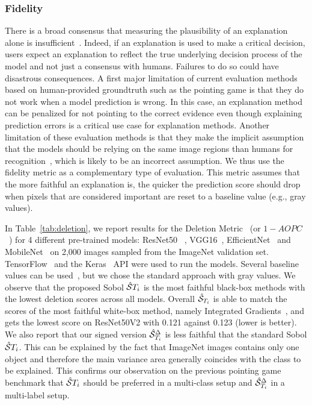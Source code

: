 \subsubsection{Fidelity}
There is a broad consensus that measuring the plausibility of an explanation alone is insufficient~\cite{adebayo2018sanity, ghorbani2017interpretation}. Indeed, if an explanation is used to make a critical decision, users expect an explanation to reflect the true underlying decision process of the model and not just a consensus with humans. Failures to do so could have disastrous consequences.
A first major limitation of current evaluation methods based on human-provided groundtruth such as the pointing game is that they do not work when a model prediction is wrong. In this case, an explanation method can be penalized for not pointing to the correct evidence even though explaining prediction errors is a critical use case for explanation methods. Another limitation of these evaluation methods is that they make the implicit assumption that the models should be relying on the same image regions than humans for recognition~\cite{ullman2016atoms, linsley2018learning}, which is likely to be an incorrect assumption. We thus use the fidelity metric as a complementary type of evaluation. This metric assumes that the more faithful an explanation is, the quicker the prediction score should drop when pixels that are considered important are reset to a baseline value (e.g., gray values).

In Table~\ref{tab:deletion}, we report results for the Deletion Metric~\cite{petsiuk2018rise} (or $1 - AOPC$~\cite{samek2016evaluating}) for 4 different pre-trained models: ResNet50~\cite{he2016deep} , VGG16~\cite{simonyan2014deep}, EfficientNet~\cite{tan2019efficientnet} and MobileNet~\cite{sandler2018mobilenetv2} on 2,000 images sampled from the ImageNet validation set. TensorFlow~\cite{tensorflow2015} and the Keras~\cite{chollet2015keras} API were used to run the models.
Several baseline values can be used~\cite{sturmfels2020visualizing}, but we chose the standard approach with gray values.
We observe that the proposed Sobol $\hat{\mathcal{S}}{T_i}$ is the most faithful black-box methods with the lowest deletion scores across all models.
Overall $\hat{\mathcal{S}}_{T_i}$ is able to match the scores of the most faithful white-box method, namely Integrated Gradients~\cite{sundararajan2017axiomatic}, and gets the lowest score on ResNet50V2 with 0.121 against 0.123 (lower is better).
We also report that our signed version $\hat{\mathcal{S}}_{T_i}^\Delta$ is less faithful that the standard Sobol $\hat{\mathcal{S}}{T_i}$. This can be explained by the fact that ImageNet images contains only one object and therefore the main variance area generally coincides with the class to be explained.
This confirms our observation on the previous pointing game benchmark that $\hat{\mathcal{S}}{T_i}$ should be preferred in  a multi-class setup and $\hat{\mathcal{S}}_{T_i}^\Delta$ in a multi-label setup.


